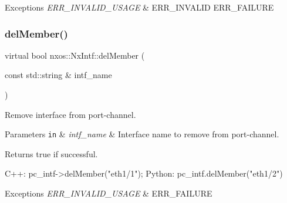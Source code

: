 \begin{DoxyExceptions}{Exceptions}
{\em E\+R\+R\+\_\+\+I\+N\+V\+A\+L\+I\+D\+\_\+\+U\+S\+A\+GE} & E\+R\+R\+\_\+\+I\+N\+V\+A\+L\+ID E\+R\+R\+\_\+\+F\+A\+I\+L\+U\+RE \\
\hline
\end{DoxyExceptions}
\mbox{\label{classnxos_1_1_nx_intf_a6886f3b84e843069a5fdf5434b061f80}} 
\subsubsection{\texorpdfstring{del\+Member()}{delMember()}}
{\footnotesize\ttfamily virtual bool nxos\+::\+Nx\+Intf\+::del\+Member (\begin{DoxyParamCaption}\item[{const std\+::string \&}]{intf\+\_\+name }\end{DoxyParamCaption})\hspace{0.3cm}{\ttfamily [pure virtual]}}

Remove interface from port-\/channel. 
\begin{DoxyParams}[1]{Parameters}
\mbox{\tt in}  & {\em intf\+\_\+name} & Interface name to remove from port-\/channel. \\
\hline
\end{DoxyParams}
\begin{DoxyReturn}{Returns}
true if successful. ~\newline
 
\begin{DoxyCode}
C++:
    pc\_intf->delMember(\textcolor{stringliteral}{"eth1/1"});
Python:
    pc\_intf.delMember(\textcolor{stringliteral}{"eth1/2"})
\end{DoxyCode}

\end{DoxyReturn}

\begin{DoxyExceptions}{Exceptions}
{\em E\+R\+R\+\_\+\+I\+N\+V\+A\+L\+I\+D\+\_\+\+U\+S\+A\+GE} & E\+R\+R\+\_\+\+F\+A\+I\+L\+U\+RE \\
\hline
\end{DoxyExceptions}
\mbox{\label{classnxos_1_1_nx_intf_a3121854504b3d9828f75e3d47f50d7f8}} 

